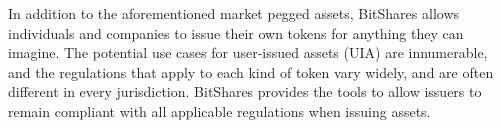 In addition to the aforementioned market pegged assets, BitShares allows
individuals and companies to issue their own tokens for anything they can
imagine. The potential use cases for user-issued assets (UIA) are innumerable,
and the regulations that apply to each kind of token vary widely, and are often
different in every jurisdiction. BitShares provides the tools to allow issuers
to remain compliant with all applicable regulations when issuing assets.

